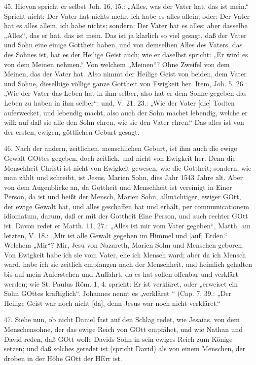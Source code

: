45. Hievon spricht er selbst Joh. 16, 15.: „Alles, was der Vater hat, das ist mein.“ Spricht nicht: Der Vater hat nichts mehr, ich habe es alles allein; oder: Der Vater hat es alles allein, ich habe nichts; sondern: Der Vater hat es alles; aber dasselbe „Alles“, das er hat, das ist mein. Das ist ja klarlich so viel gesagt, daß der Vater und Sohn eine einige Gottheit haben, und von demselben Alles des Vaters, das des Sohnes ist, hat es der Heilige Geist auch; wie er daselbst spricht: „Er wird es von dem Meinen nehmen.“ Von welchem „Meinen“? Ohne Zweifel von dem Meinen, das der Vater hat. Also nimmt der Heilige Geist von beiden, dem Vater und Sohne, dieselbige völlige ganze Gottheit von Ewigkeit her. Item, Joh. 5, 26.: „Wie der Vater das Leben hat in ihm selber, also hat er dem Sohne gegeben das Leben zu haben in ihm selber“; und, V. 21. 23.: „Wie der Vater [die] Todten auferwecket, und lebendig macht, also auch der Sohn machet lebendig, welche er will; auf daß sie alle den Sohn ehren, wie sie den Vater ehren.“ Das alles ist von der ersten, ewigen, göttlichen Geburt gesagt.

46. Nach der andern, zeitlichen, menschlichen Geburt, ist ihm auch die ewige Gewalt GOttes gegeben, doch zeitlich, und nicht von Ewigkeit her. Denn die Menschheit Christi ist nicht von Ewigkeit gewesen, wie die Gottheit; sondern, wie man zählt und schreibt, ist Jesus, Marien Sohn, dies Jahr 1543 Jahre alt. Aber von dem Augenblicke an, da Gottheit und Menschheit ist vereinigt in Einer Person, da ist und heißt der Mensch, Marien Sohn, allmächtiger, ewiger GOtt, der ewige Gewalt hat, und alles geschaffen hat und erhält, per communicationem idiomatum, darum, daß er mit der Gottheit Eine Person, und auch rechter GOtt ist. Davon redet er Matth. 11, 27.: „Alles ist mir vom Vater gegeben“, Matth. am letzten, V. 18.: „Mir ist alle Gewalt gegeben im Himmel und [auf] Erden.“ Welchem „Mir“? Mir, Jesu von Nazareth, Marien Sohn und Menschen geboren. Von Ewigkeit habe ich sie vom Vater, ehe ich Mensch ward; aber da ich Mensch ward, habe ich sie zeitlich empfangen nach der Menschheit, und heimlich gehalten bis auf mein Auferstehen und Auffahrt, da es hat sollen offenbar und verklärt werden; wie St. Paulus Röm. 1, 4. spricht: Er ist verkläret, oder „erweiset ein Sohn GOttes kräftiglich“. Johannes nennt es „verkläret
“ (Cap. 7, 39.: „Der Heilige Geist war noch nicht [da], denn Jesus war noch nicht verkläret.“

47. Siehe nun, ob nicht Daniel fast auf den Schlag redet, wie Jesaias, von dem Menschensohne, der das ewige Reich von GOtt empfähet, und wie Nathan und David reden, daß GOtt wolle Davids Sohn in sein ewiges Reich zum Könige setzen; und daß solches geredet ist (spricht David) als von einem Menschen, der droben in der Höhe GOtt der HErr ist.

